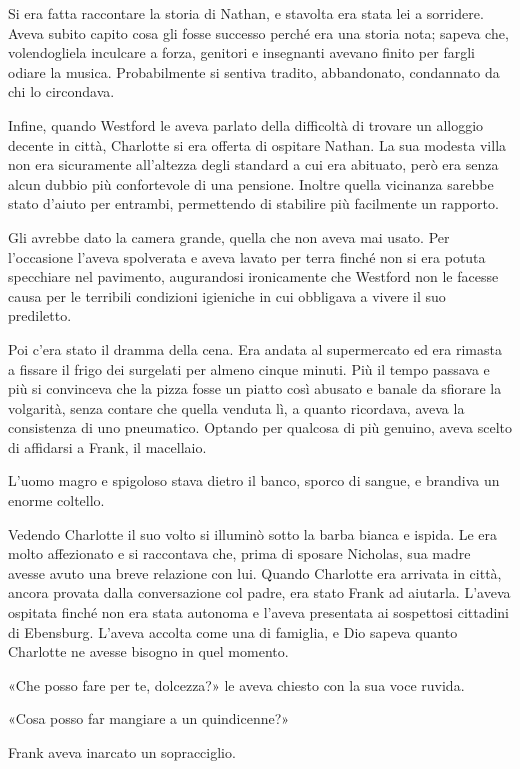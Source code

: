 \documentclass[a4paper,oneside,11pt]{memoir}
\begin{document}
Si era fatta raccontare la storia di Nathan, e stavolta era stata lei a
sorridere. Aveva subito capito cosa gli fosse successo perché era una storia
nota; sapeva che, volendogliela inculcare a forza, genitori e insegnanti avevano
finito per fargli odiare la musica. Probabilmente si sentiva tradito,
abbandonato, condannato da chi lo circondava.

Infine, quando Westford le aveva parlato della difficoltà di trovare un alloggio
decente in città, Charlotte si era offerta di ospitare Nathan. La sua modesta
villa non era sicuramente all'altezza degli standard a cui era abituato, però
era senza alcun dubbio più confortevole di una pensione. Inoltre quella
vicinanza sarebbe stato d'aiuto per entrambi, permettendo di stabilire più
facilmente un rapporto.

Gli avrebbe dato la camera grande, quella che non aveva mai usato. Per
l'occasione l'aveva spolverata e aveva lavato per terra finché non si era potuta
specchiare nel pavimento, augurandosi ironicamente che Westford non le facesse
causa per le terribili condizioni igieniche in cui obbligava a vivere il suo
prediletto.

Poi c'era stato il dramma della cena. Era andata al supermercato ed era rimasta
a fissare il frigo dei surgelati per almeno cinque minuti. Più il tempo passava
e più si convinceva che la pizza fosse un piatto così abusato e banale da
sfiorare la volgarità, senza contare che quella venduta lì, a quanto ricordava,
aveva la consistenza di uno pneumatico. Optando per qualcosa di più genuino,
aveva scelto di affidarsi a Frank, il macellaio.

L'uomo magro e spigoloso stava dietro il banco, sporco di sangue, e brandiva un
enorme coltello.

Vedendo Charlotte il suo volto si illuminò sotto la barba bianca e ispida. Le
era molto affezionato e si raccontava che, prima di sposare Nicholas, sua madre
avesse avuto una breve relazione con lui. Quando Charlotte era arrivata in
città, ancora provata dalla conversazione col padre, era stato Frank ad
aiutarla. L'aveva ospitata finché non era stata autonoma e l'aveva presentata ai
sospettosi cittadini di Ebensburg. L'aveva accolta come una di famiglia, e Dio
sapeva quanto Charlotte ne avesse bisogno in quel momento.

«Che posso fare per te, dolcezza?» le aveva chiesto con la sua voce ruvida.

«Cosa posso far mangiare a un quindicenne?»

Frank aveva inarcato un sopracciglio.
\end{document}
